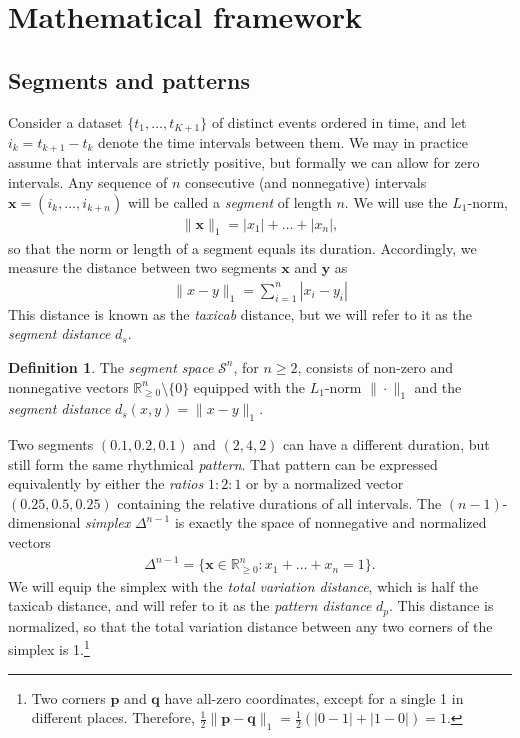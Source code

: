 \documentclass[suppldata]{tMAM2e}%
\newcommand{\RR}{\mathbb{R}}
\newcommand{\vect}[1]{\mathbf{#1}}
\newcommand{\vx}{\vect x}
\newcommand{\vy}{\vect y}
\newcommand{\vp}{\vect p}
\newcommand{\vq}{\vect q}
\theoremstyle{plain}
\theoremstyle{definition}
\newtheorem{definition}[theorem]{Definition}
\theoremstyle{remark}
\begin{document}



\section{Mathematical framework}


\subsection{Segments and patterns}

Consider a dataset $\{t_1, \dots, t_{K+1}\}$ of distinct events ordered in time, and let $i_k = t_{k+1}-t_k$ denote the time intervals between them.
We may in practice assume that intervals are strictly positive, but formally we can allow for zero intervals.
Any sequence of $n$ consecutive (and nonnegative) intervals $\vx = (i_k, \dots, i_{k+n})$ will be called a \emph{segment} of length $n$.
We will use the $L_1$-norm,
\begin{align}
  \|\vx\|_1 = |x_1| + \dots + |x_n|,
\end{align}
so that the norm or length of a segment equals its duration.
Accordingly, we measure the distance between two segments $\vx$ and $\vy$ as
\begin{align}
  \|x-y\|_1 = \sum_{i=1}^n |x_i-y_i|
\end{align}
This distance is known as the \emph{taxicab} distance, but we will refer to it as the \emph{segment distance} $d_s$.


\begin{definition}
  The \emph{segment space} $\mathcal{S}^n$, for $n\ge 2$, consists of non-zero and nonnegative vectors $\RR_{\ge 0}^n \setminus \{0\}$ equipped with the $L_1$-norm $\|\cdot\|_1$ and the \emph{segment distance} $d_s(x, y) = \|x-y\|_1$.
\end{definition}

Two segments $(0.1, 0.2, 0.1)$ and $(2, 4, 2)$ can have a different duration, but still form the same rhythmical \emph{pattern}.
That pattern can be expressed equivalently by either the \emph{ratios} $1 : 2 : 1$ or by a normalized vector $(0.25, 0.5, 0.25)$ containing the relative durations of all intervals.
The $(n-1)$-dimensional \emph{simplex} $\Delta^{n-1}$ is exactly the space of nonnegative and normalized vectors
\begin{align}
  \Delta^{n-1}
  = \{ \vx \in \RR_{\ge 0}^n: x_1 + \dots + x_n = 1\}.
\end{align}
We will equip the simplex with the \emph{total variation distance}, which is half the taxicab distance, and will refer to it as the \emph{pattern distance} $d_p$.
This distance is normalized, so that the total variation distance between any two corners of the simplex is 1.\footnote{%
  Two corners $\vp$ and $\vq$ have all-zero coordinates, except for a single 1 in different places. 
Therefore, $\tfrac{1}{2}\|\vp-\vq\|_1 = \tfrac{1}{2} (|0-1| + |1 - 0|) = 1$.
}
\end{document}
